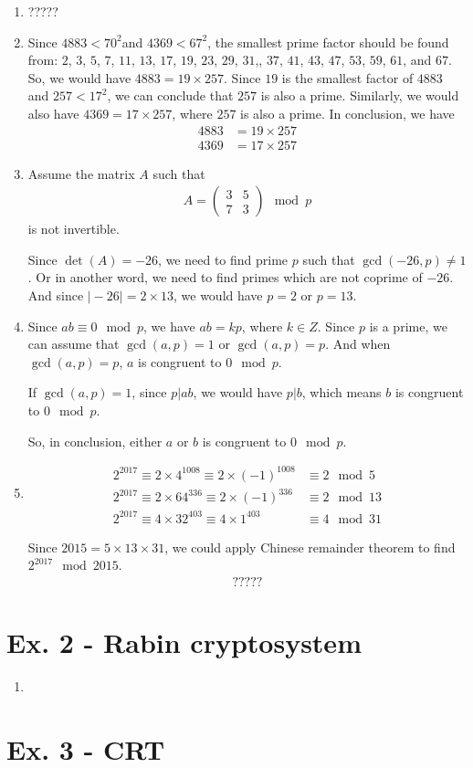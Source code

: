 \documentclass[11pt,a4paper]{article}
\begin{document}
\begin{enumerate}
	\item ?????
	
	\item Since $4883 < 70^{2}$and $4369 < 67^{2}$, the smallest prime factor should be found from: $2$, $3$, $5$, $7$, $11$, $13$, $17$, $19$, $23$, $29$, $31$,, $37$, $41$, $43$, $47$, $53$, $59$, $61$, and $67$. So, we would have $4883 = 19 \times 257$. Since $19$ is the smallest factor of $4883$ and $257 < 17^{2}$, we can conclude that $257$ is also a prime. Similarly, we would also have $4369 = 17 \times 257$, where $257$ is also a prime. In conclusion, we have
		\begin{align*}
			4883 &= 19 \times 257 \\
			4369 &= 17 \times 257
		\end{align*}
		
	\item Assume the matrix $A$ such that
		\begin{align*}
			A = \begin{pmatrix} 3 & 5 \\ 7 & 3 \end{pmatrix} \mod p
		\end{align*}
		is not invertible.
	\par Since $\det(A) = -26$, we need to find prime $p$ such that $\gcd(-26, p) \neq 1$. Or in another word, we need to find primes which are not coprime of $-26$. And since $\vert -26 \vert = 2 \times 13$, we would have $p = 2$ or $p = 13$.
	
	\item Since $ab \equiv 0 \mod p$, we have $ab = kp$, where $k \in Z$. Since $p$ is a prime, we can assume that $\gcd(a, p) = 1$ or $\gcd(a, p) = p$. And when $\gcd(a, p) = p$, $a$ is congruent to $0 \mod p$.
	\par If $\gcd(a, p) = 1$, since $p \vert ab$, we would have $p \vert b$, which means $b$ is congruent to $0 \mod p$.
	\par So, in conclusion, either $a$ or $b$ is congruent to $0 \mod p$.
	
	\item 
		\begin{align*}
			2^{2017} \equiv 2 \times 4^{1008} \equiv 2 \times (-1)^{1008} &\equiv 2 \mod 5 \\
			2^{2017} \equiv 2 \times 64^{336} \equiv 2 \times (-1)^{336} &\equiv 2 \mod 13 \\
			2^{2017} \equiv 4 \times 32^{403} \equiv 4 \times 1^{403} &\equiv 4 \mod 31
		\end{align*}
	\par Since $2015 = 5 \times 13 \times 31$, we could apply Chinese remainder theorem to find $2^{2017} \mod 2015$.
		\begin{align*}
			?????
		\end{align*}
	
\end{enumerate}


\section*{Ex. 2 - Rabin cryptosystem}
\begin{enumerate}
	\item 
\end{enumerate}

\section*{Ex. 3 - CRT}
\end{document}
